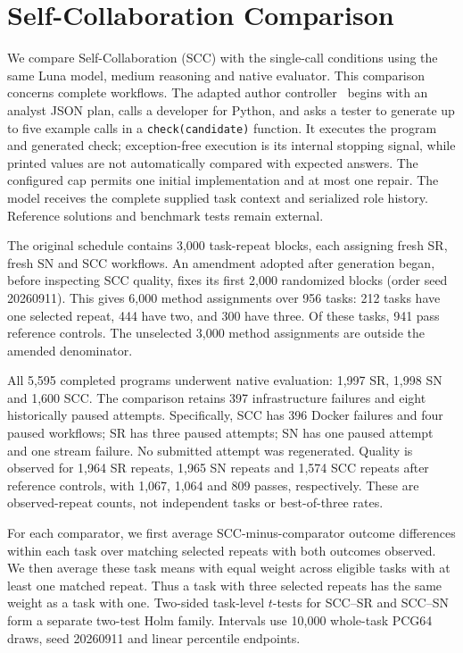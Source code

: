 \section{Self-Collaboration Comparison}
We compare Self-Collaboration (SCC) with the single-call conditions using the same Luna model, medium reasoning and native evaluator. This comparison concerns complete workflows. The adapted author controller~\cite{scc2024source} begins with an analyst JSON plan, calls a developer for Python, and asks a tester to generate up to five example calls in a \texttt{check(candidate)} function. It executes the program and generated check; exception-free execution is its internal stopping signal, while printed values are not automatically compared with expected answers. The configured cap permits one initial implementation and at most one repair. The model receives the complete supplied task context and serialized role history. Reference solutions and benchmark tests remain external.

The original schedule contains 3,000 task-repeat blocks, each assigning fresh SR, fresh SN and SCC workflows. An amendment adopted after generation began, before inspecting SCC quality, fixes its first 2,000 randomized blocks (order seed 20260911). This gives 6,000 method assignments over 956 tasks: 212 tasks have one selected repeat, 444 have two, and 300 have three. Of these tasks, 941 pass reference controls. The unselected 3,000 method assignments are outside the amended denominator.

All 5,595 completed programs underwent native evaluation: 1,997 SR, 1,998 SN and 1,600 SCC. The comparison retains 397 infrastructure failures and eight historically paused attempts. Specifically, SCC has 396 Docker failures and four paused workflows; SR has three paused attempts; SN has one paused attempt and one stream failure. No submitted attempt was regenerated. Quality is observed for 1,964 SR repeats, 1,965 SN repeats and 1,574 SCC repeats after reference controls, with 1,067, 1,064 and 809 passes, respectively. These are observed-repeat counts, not independent tasks or best-of-three rates.

For each comparator, we first average SCC-minus-comparator outcome differences within each task over matching selected repeats with both outcomes observed. We then average these task means with equal weight across eligible tasks with at least one matched repeat. Thus a task with three selected repeats has the same weight as a task with one. Two-sided task-level $t$-tests for SCC--SR and SCC--SN form a separate two-test Holm family. Intervals use 10,000 whole-task PCG64 draws, seed 20260911 and linear percentile endpoints.

